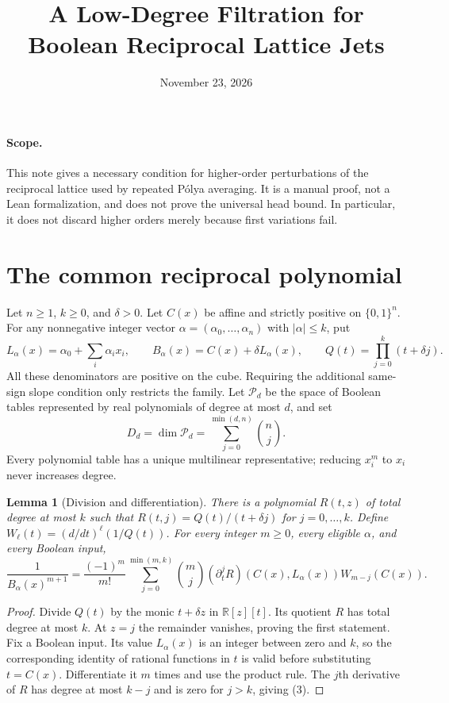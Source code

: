 \documentclass[11pt]{article}
\title{A Low-Degree Filtration for Boolean Reciprocal Lattice Jets}
\author{}
\date{November 23, 2026}
\newtheorem{lemma}[theorem]{Lemma}
\begin{document}
\maketitle

\paragraph{Scope.}
This note gives a necessary condition for higher-order perturbations
of the reciprocal lattice used by repeated P\'olya averaging. It is
a manual proof, not a Lean formalization, and does not prove the
universal head bound. In particular, it does not discard higher
orders merely because first variations fail.

\section{The common reciprocal polynomial}

Let $n\ge1$, $k\ge0$, and $\delta>0$. Let $C(x)$ be affine and
strictly positive on $\{0,1\}^n$. For any nonnegative integer vector
$\alpha=(\alpha_0,\ldots,\alpha_n)$ with $|\alpha|\le k$, put
\[
 L_\alpha(x)=\alpha_0+\sum_i\alpha_i x_i,
 \qquad B_\alpha(x)=C(x)+\delta L_\alpha(x),
 \qquad Q(t)=\prod_{j=0}^k(t+\delta j).
 \tag{1}
\]
All these denominators are positive on the cube. Requiring the
additional same-sign slope condition only restricts the family.
Let $\mathcal P_d$ be the space of Boolean tables represented by
real polynomials of degree at most $d$, and set
\[
            D_d=\dim\mathcal P_d
                  =\sum_{j=0}^{\min(d,n)}\binom nj.
 \tag{2}
\]
Every polynomial table has a unique multilinear representative;
reducing $x_i^m$ to $x_i$ never increases degree.

\begin{lemma}[Division and differentiation]
There is a polynomial $R(t,z)$ of total degree at most $k$ such that
$R(t,j)=Q(t)/(t+\delta j)$ for $j=0,\ldots,k$. Define
$W_\ell(t)=(d/dt)^\ell(1/Q(t))$. For every integer $m\ge0$,
every eligible $\alpha$, and every Boolean input,
\[
 \frac1{B_\alpha(x)^{m+1}}
 =\frac{(-1)^m}{m!}
   \sum_{j=0}^{\min(m,k)}\binom mj
       (\partial_t^j R)(C(x),L_\alpha(x))W_{m-j}(C(x)).
 \tag{3}
\]
\end{lemma}
\begin{proof}
Divide $Q(t)$ by the monic $t+\delta z$ in $\mathbb R[z][t]$.
Its quotient $R$ has total degree at most $k$. At $z=j$ the
remainder vanishes, proving the first statement. Fix a Boolean
input. Its value $L_\alpha(x)$ is an integer between zero and $k$,
so the corresponding identity of rational functions in $t$ is
valid before substituting $t=C(x)$. Differentiate it $m$ times
and use the product rule. The $j$th derivative of $R$ has degree
at most $k-j$ and is zero for $j>k$, giving (3).
\end{proof}
\end{document}

